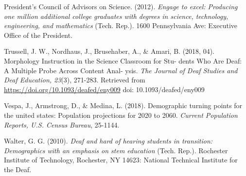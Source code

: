 \documentclass[11.5pt]{sig-alternate} %
\begin{document}
President’s Council of Advisors on Science. (2012). \textit{Engage to excel: Producing one million additional college graduates with degrees in science, technology, engineering, and mathematics} (Tech. Rep.). 1600 Pennsylvania Ave: Executive Office of the President. 

Trussell, J. W., Nordhaus, J., Brusehaber, A., \& Amari, B. (2018, 04). Morphology Instruction in the Science Classroom for Stu- dents Who Are Deaf: A Multiple Probe Across Content Anal- ysis. \textit{The Journal of Deaf Studies and Deaf Education, 23}(3), 271-283. Retrieved from \url{https://doi.org/10.1093/deafed/eny009} doi: 10.1093/deafed/eny009 

Vespa, J., Armstrong, D., \& Medina, L. (2018). Demographic turning points for the united states: Population projections for 2020 to 2060. \textit{Current Population Reports, U.S. Census Bureau}, 25-1144. 

Walter, G. G. (2010). \textit{Deaf and hard of hearing students in transition: Demographics with an emphasis on stem education} (Tech. Rep.). Rochester Institute of Technology, Rochester, NY 14623: National Technical Institute for the Deaf. 
\end{document}
